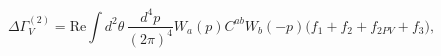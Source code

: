 \begin{equation}\label{Two_Loop_Effective_Action_HD}
\Delta\Gamma^{(2)}_{V} = \mbox{Re} \int d^2\theta\,
\frac{d^4p}{(2\pi)^4} W_a(p) C^{ab} W_b(-p)
\Big(f_1 + f_2 + f_{2PV} + f_3 \Big),
\end{equation}

